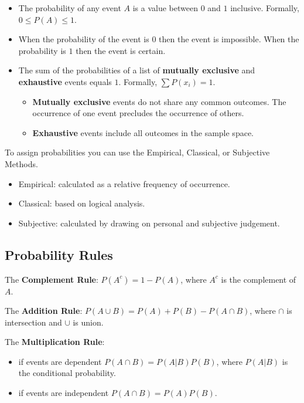 \documentclass[
  letterpaper,
  DIV=11,
  numbers=noendperiod]{scrreprt}
\begin{document}
\begin{itemize}
\item
  The probability of any event \(A\) is a value between \(0\) and \(1\)
  inclusive. Formally, \(0\leq P(A) \leq1\).
\item
  When the probability of the event is \(0\) then the event is
  impossible. When the probability is \(1\) then the event is certain.
\item
  The sum of the probabilities of a list of \textbf{mutually exclusive}
  and \textbf{exhaustive} events equals \(1\). Formally,
  \(\sum P(x_i)=1\).

  \begin{itemize}
  \item
    \textbf{Mutually exclusive} events do not share any common outcomes.
    The occurrence of one event precludes the occurrence of others.
  \item
    \textbf{Exhaustive} events include all outcomes in the sample space.
  \end{itemize}
\end{itemize}

To assign probabilities you can use the Empirical, Classical, or
Subjective Methods.

\begin{itemize}
\item
  Empirical: calculated as a relative frequency of occurrence.
\item
  Classical: based on logical analysis.
\item
  Subjective: calculated by drawing on personal and subjective
  judgement.
\end{itemize}

\hypertarget{probability-rules}{%
\subsection*{Probability Rules}\label{probability-rules}}

The \textbf{Complement Rule}: \(P(A^c)=1-P(A)\), where \(A^c\) is the
complement of \(A\).

The \textbf{Addition Rule}: \(P(A \cup B)=P(A)+P(B)-P(A \cap B)\), where
\(\cap\) is intersection and \(\cup\) is union.

The \textbf{Multiplication Rule}:

\begin{itemize}
\item
  if events are dependent \(P(A \cap B)= P(A|B)P(B)\), where \(P(A|B)\)
  is the conditional probability.
\item
  if events are independent \(P(A \cap B)= P(A)P(B)\).
\end{itemize}
\end{document}
